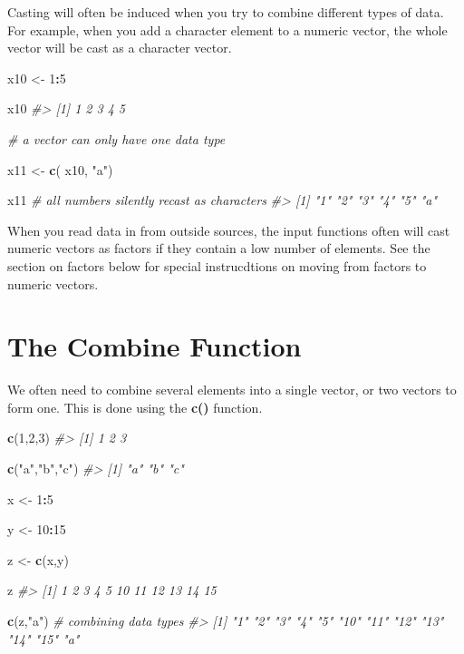 \documentclass[]{book}
\newenvironment{Shaded}{\begin{snugshade}}{\end{snugshade}}
\newcommand{\CommentTok}[1]{\textcolor[rgb]{0.56,0.35,0.01}{\textit{#1}}}
\newcommand{\DecValTok}[1]{\textcolor[rgb]{0.00,0.00,0.81}{#1}}
\newcommand{\KeywordTok}[1]{\textcolor[rgb]{0.13,0.29,0.53}{\textbf{#1}}}
\newcommand{\NormalTok}[1]{#1}
\newcommand{\OperatorTok}[1]{\textcolor[rgb]{0.81,0.36,0.00}{\textbf{#1}}}
\newcommand{\StringTok}[1]{\textcolor[rgb]{0.31,0.60,0.02}{#1}}
\theoremstyle{definition}
\theoremstyle{definition}
\theoremstyle{definition}
\theoremstyle{remark}
\begin{document}
Casting will often be induced when you try to combine different types of
data. For example, when you add a character element to a numeric vector,
the whole vector will be cast as a character vector.

\begin{Shaded}
\begin{Highlighting}[]

\NormalTok{x10 <-}\StringTok{ }\DecValTok{1}\OperatorTok{:}\DecValTok{5}

\NormalTok{x10}
\CommentTok{#> [1] 1 2 3 4 5}

\CommentTok{# a vector can only have one data type}

\NormalTok{x11 <-}\StringTok{ }\KeywordTok{c}\NormalTok{( x10, }\StringTok{"a"}\NormalTok{)}

\NormalTok{x11 }\CommentTok{# all numbers silently recast as characters}
\CommentTok{#> [1] "1" "2" "3" "4" "5" "a"}
\end{Highlighting}
\end{Shaded}

When you read data in from outside sources, the input functions often
will cast numeric vectors as factors if they contain a low number of
elements. See the section on factors below for special instrucdtions on
moving from factors to numeric vectors.

\hypertarget{the-combine-function}{%
\section{The Combine Function}\label{the-combine-function}}

We often need to combine several elements into a single vector, or two
vectors to form one. This is done using the \textbf{c()} function.

\begin{Shaded}
\begin{Highlighting}[]

\KeywordTok{c}\NormalTok{(}\DecValTok{1}\NormalTok{,}\DecValTok{2}\NormalTok{,}\DecValTok{3}\NormalTok{)}
\CommentTok{#> [1] 1 2 3}

\KeywordTok{c}\NormalTok{(}\StringTok{"a"}\NormalTok{,}\StringTok{"b"}\NormalTok{,}\StringTok{"c"}\NormalTok{)}
\CommentTok{#> [1] "a" "b" "c"}

\NormalTok{x <-}\StringTok{ }\DecValTok{1}\OperatorTok{:}\DecValTok{5}

\NormalTok{y <-}\StringTok{ }\DecValTok{10}\OperatorTok{:}\DecValTok{15}

\NormalTok{z <-}\StringTok{ }\KeywordTok{c}\NormalTok{(x,y)}

\NormalTok{z}
\CommentTok{#>  [1]  1  2  3  4  5 10 11 12 13 14 15}

\KeywordTok{c}\NormalTok{(z,}\StringTok{"a"}\NormalTok{)  }\CommentTok{# combining data types }
\CommentTok{#>  [1] "1"  "2"  "3"  "4"  "5"  "10" "11" "12" "13" "14" "15" "a"}
\end{Highlighting}
\end{Shaded}
\end{document}
